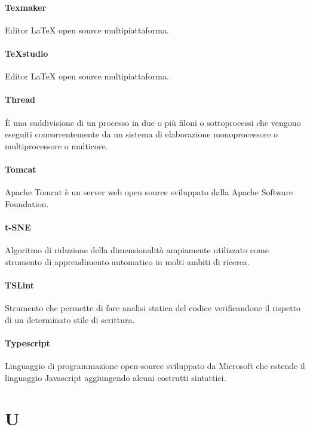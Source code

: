\documentclass[]{article}
\begin{document}
	\paragraph*{Texmaker}
	Editor LaTeX open source multipiattaforma.

	\paragraph*{TeXstudio}
	Editor LaTeX open source multipiattaforma.

	\paragraph*{Thread}
	È una suddivisione di un processo in due o più filoni o sottoprocessi che vengono eseguiti concorrentemente da un sistema di elaborazione monoprocessore o multiprocessore o multicore.

	\paragraph*{Tomcat}
	Apache Tomcat è un server web open source sviluppato dalla Apache Software Foundation.

	\paragraph*{t-SNE}
	Algoritmo di riduzione della dimensionalità ampiamente utilizzato come strumento di apprendimento automatico in molti ambiti di ricerca.

	\paragraph*{TSLint}
	Strumento che permette di fare analisi statica del codice verificandone il rispetto di un determinato stile di scrittura.

	\paragraph*{Typescript}
	Linguaggio di programmazione open-source sviluppato da Microsoft che estende il linguaggio Javascript aggiungendo alcuni costrutti sintattici.

	\newpage

	\section*{U}
\end{document}
